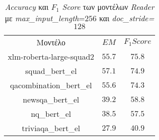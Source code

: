 \begin{table}[!htb]
    \captionsetup{justification=centering}
    \begin{center}
        \caption{\emph{Accuracy} και \emph{$F_1$ Score} των μοντέλων \emph{Reader} με \emph{max\_input\_length}=$256$ και \emph{doc\_stride=$128$}}
        \begin{tabular}{ | c | c | c | }
            \hline
            \rowcolor{Gray}
            Μοντέλο & \textbf{\emph{$EM$}} & \textbf{\emph{$F_1 Score$}}\\
            xlm-roberta-large-squad2 & $55.7$ & $75.8$\\
            squad\_bert\_el & $57.1$ & $74.9$\\
            qacombination\_bert\_el & $55.6$ & $74.3$\\
            newsqa\_bert\_el & $39.2$ & $58.8$\\
            nq\_bert\_el & $38.5$ & $57.5$\\
            triviaqa\_bert\_el & $27.9$ & $40.9$\\
            \hline
        \end{tabular}
        \label{tab:reader_scores1}
    \end{center}
\end{table}